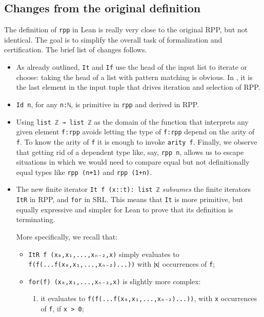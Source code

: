 \documentclass[preprint]{elsarticle}
\theoremstyle{remark}
\newcommand{\RPP}{\textsf{RPP}\xspace}
\newcommand{\LEAN}{\textsf{Lean}\xspace}
\newcommand{\SRL}{\textsf{SRL}\xspace}
\begin{document}
\subsection{Changes from the original definition}
The definition of \lstinline|rpp| in \LEAN is really very close to the original \RPP, but not identical. The goal is to simplify the overall task of formalization and certification. The brief list of changes follows.
\begin{itemize}
    \item As already outlined, \lstinline|It| and \lstinline|If| use the head of the input list to iterate or choose: taking the head of a list with pattern matching is obvious. In \cite{DBLP:journals/tcs/PaoliniPR20}, it is the last element in the input tuple that drives iteration and selection of \RPP.

    \item \lstinline|Id n|, for any \lstinline|n:ℕ|, is primitive in \lstinline|rpp| and derived in \RPP.

    \item Using \lstinline|list ℤ → list ℤ| as the domain of the function that interprets any given element \lstinline|f:rpp| avoids  letting the type of \lstinline|f:rpp| depend on the arity of \lstinline|f|. To know the arity of \lstinline|f| it is enough to invoke \lstinline|arity f|. Finally, we observe that getting rid of a dependent type like, say, \lstinline|rpp n|, allows us to escape situations in which we would need to compare equal but not definitionally equal types like \lstinline|rpp (n+1)| and \lstinline|rpp (1+n)|.

    \item The new finite iterator \lstinline|It f (x::t): list ℤ| \emph{subsumes} the finite iterators \lstinline|ItR| in \RPP, and \lstinline|for| in \SRL. This means that \lstinline|It| is more primitive, but equally expressive and simpler for \LEAN to prove that its definition is terminating.

    More specifically, we recall that:
    \begin{itemize}
        \item \lstinline|ItR f (x₀,x₁,...,xₙ₋₂,x)| simply evaluates to \lstinline|f(f(...f(x₀,x₁,...,xₙ₋₂)...))| with $ \mid\!\!\mbox{\lstinline|x|}\!\!\mid $ occurrences of \lstinline|f|;

        \item \lstinline|for(f) (x₀,x₁,...,xₙ₋₂,x)| is slightly more complex:
        \begin{enumerate}
            \item it evaluates to \lstinline|f(f(...f(x₀,x₁,...,xₙ₋₂)...))|, with \lstinline|x| occurrences of \lstinline|f|, if \lstinline|x > 0|;


\end{enumerate}
\end{itemize}
\end{itemize}
\end{document}
